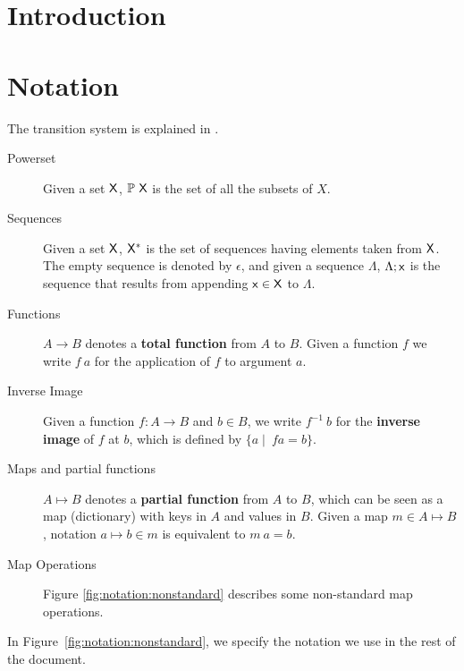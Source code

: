 \documentclass[11pt,a4paper,dvipsnames]{article}
\theoremstyle{definition}
\theoremstyle{definition}
\begin{document}


\tableofcontents
\listoffigures

\section{Introduction}
\label{sec:introduction}


\section{Notation}\label{sec:notation}

The transition system is explained in \cite{small_step_semantics}.

\begin{description}
  \item[Powerset] Given a set $\mathsf{X}$, $\mathbb{P}~\mathsf{X}$ is the set of all
    the subsets of $X$.
  \item[Sequences] Given a set $\mathsf{X}$, $\mathsf{X}^{*}$ is the set of
    sequences having elements taken from $\mathsf{X}$. The empty sequence is
    denoted by $\epsilon$, and given a sequence $\Lambda$, $\Lambda; \mathsf{x}$ is
    the sequence that results from appending $\mathsf{x} \in \mathsf{X}$ to
    $\Lambda$.
  \item[Functions] $A \to B$ denotes a \textbf{total function} from $A$ to $B$.
    Given a function $f$ we write $f~a$ for the application of $f$ to argument
    $a$.
  \item[Inverse Image] Given a function $f: A \to B$ and $b\in B$, we write
    $f^{-1}~b$ for the \textbf{inverse image} of $f$ at $b$, which is defined by
    $\{a \mid\ f a =  b\}$.
  \item[Maps and partial functions] $A \mapsto B$ denotes a \textbf{partial
    function} from $A$ to $B$, which can be seen as a map (dictionary) with
    keys in $A$ and values in $B$. Given a map $m \in A \mapsto B$, notation
    $a \mapsto b \in m$ is equivalent to $m~ a = b$.
  \item[Map Operations] Figure \ref{fig:notation:nonstandard}
    describes some non-standard map operations.

\end{description}

In Figure~\ref{fig:notation:nonstandard}, we specify the notation we use in
the rest of the document.
\end{document}
